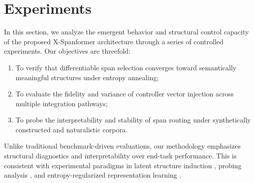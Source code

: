 \section{Experiments}
\label{sec:experiments}

In this section, we analyze the emergent behavior and structural control capacity of the proposed X-Spanformer architecture through a series of controlled experiments. Our objectives are threefold:
\begin{enumerate}[leftmargin=2em]
    \item To verify that differentiable span selection converges toward semantically meaningful structures under entropy annealing;
    \item To evaluate the fidelity and variance of controller vector injection across multiple integration pathways;
    \item To probe the interpretability and stability of span routing under synthetically constructed and naturalistic corpora.
\end{enumerate}

Unlike traditional benchmark-driven evaluations, our methodology emphasizes structural diagnostics and interpretability over end-task performance. This is consistent with experimental paradigms in latent structure induction \cite{kim2019unsupervised, naradowsky2021structured, ma2023hierarchical}, probing analysis \cite{belinkov2022probing, hewitt2019structural}, and entropy-regularized representation learning \cite{pereyra2017regularizing, grandvalet2005semi}.

